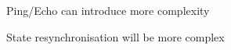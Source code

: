 
\begin{description}[style=nextline]
  \item[R1\label{r1}] Ping/Echo can introduce more complexity
  \item[R2\label{r2}] State resynchronisation will be more complex
\end{description}
